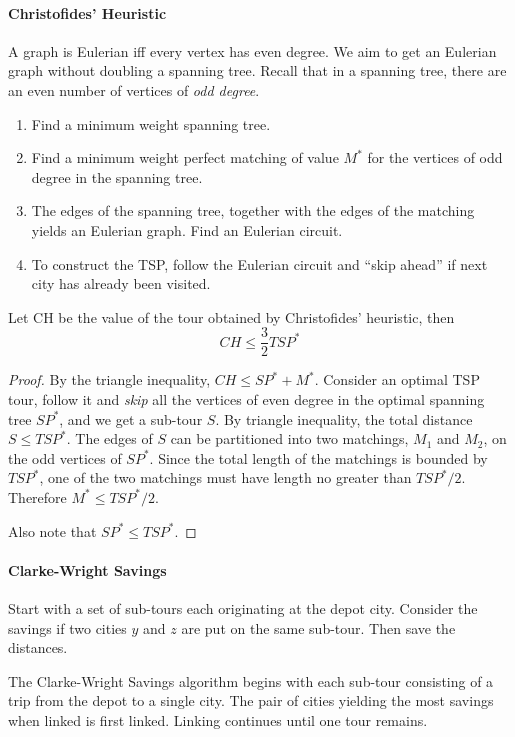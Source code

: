 \paragraph{Christofides' Heuristic}
A graph is Eulerian iff every vertex has even degree. 
We aim to get an Eulerian graph without doubling a spanning tree.
Recall that in a spanning tree, there are an even number of vertices of \emph{odd degree}.
\begin{enumerate}
\item
Find a minimum weight spanning tree.
\item
Find a minimum weight perfect matching of value $M^*$ for the vertices
of odd degree in the spanning tree.
\item
The edges of the spanning tree, together with the edges of the matching yields an Eulerian graph. Find an Eulerian circuit.
\item
To construct the TSP, follow the Eulerian circuit and “skip ahead” if next city has already been visited.
\end{enumerate}
\begin{theorem}
Let CH be the value of the tour obtained by Christofides’ heuristic, then
\[
CH\le \frac{3}{2}TSP^*
\]
\end{theorem}
\begin{proof}
By the triangle inequality, $CH\le SP^*+M^*$. 
Consider an optimal TSP tour, follow it and \emph{skip} all the vertices of even degree in the optimal spanning tree $SP^*$, and we get a sub-tour $S$.
By triangle inequality, the total distance $S\le TSP^*$.
The edges of $S$ can be partitioned into two matchings, $M_1$ and $M_2$, on the odd vertices of $SP^*$.
Since the total length of the matchings is bounded by $TSP^*$,
one of the two matchings must have length no greater than $TSP^*/2$.
Therefore $M^*\le TSP^*/2$.

Also note that $SP^*\le TSP^*$.
\end{proof}


\paragraph{Clarke-Wright Savings}
Start with a set of sub-tours each originating at the depot city.
Consider the savings if two cities $y$ and $z$ are put on the same sub-tour.
Then save the distances.


The Clarke-Wright Savings algorithm begins with each sub-tour consisting of a trip from the depot to a single city. The pair of cities yielding the most savings when linked is first linked. Linking continues until one tour remains.


